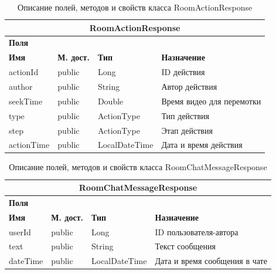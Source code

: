 \documentclass{../includes/TechDoc}
\begin{document}
    \begin{table}[h]
        \caption{\label{tab:class-WebsocketEventListener-table}Описание полей, методов и свойств класса RoomActionResponse}
        \begin{tabularx}{\textwidth}{|l|l|l|X|}
            \hline
            \multicolumn{4}{|c|}{RoomActionResponse} \\ \hline
            \multicolumn{4}{|l|}{\textbf{Поля}} \\ \hline
            \textbf{Имя} & \textbf{М. дост.} & \textbf{Тип}  & \textbf{Назначение}       \\ \hline
            actionId     & public            & Long          & ID действия               \\ \hline
            author       & public            & String        & Автор действия            \\ \hline
            seekTime     & public            & Double        & Время видео для перемотки \\ \hline
            type         & public            & ActionType    & Тип действия              \\ \hline
            step         & public            & ActionType    & Этап действия             \\ \hline
            actionTime   & public            & LocalDateTime & Дата и время действия     \\ \hline
        \end{tabularx}
    \end{table}

    \begin{table}[h]
        \caption{\label{tab:class-WebsocketEventListener-table}Описание полей, методов и свойств класса RoomChatMessageResponse}
        \begin{tabularx}{\textwidth}{|l|l|l|X|}
            \hline
            \multicolumn{4}{|c|}{RoomChatMessageResponse} \\ \hline
            \multicolumn{4}{|l|}{\textbf{Поля}} \\ \hline
            \textbf{Имя} & \textbf{М. дост.} & \textbf{Тип}  & \textbf{Назначение}           \\ \hline
            userId       & public            & Long          & ID пользователя-автора        \\ \hline
            text         & public            & String        & Текст сообщения               \\ \hline
            dateTime     & public            & LocalDateTime & Дата и время сообщения в чате \\ \hline
        \end{tabularx}
    \end{table}
\end{document}
